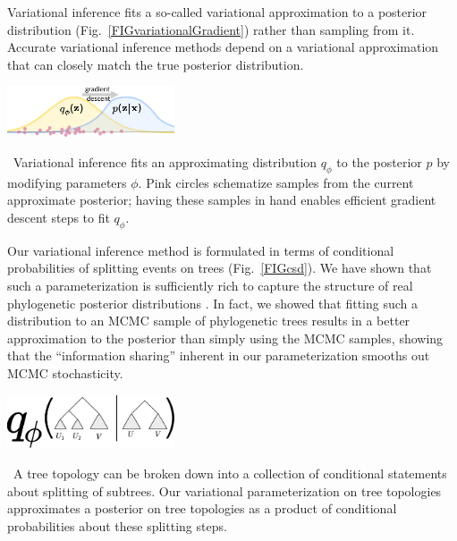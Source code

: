 \documentclass[nobib]{tufte-handout}
\begin{document}
Variational inference fits a so-called variational approximation to a posterior distribution (Fig.~\ref{FIGvariationalGradient}) rather than sampling from it.
Accurate variational inference methods depend on a variational approximation that can closely match the true posterior distribution.

\begin{marginfigure}[0.in]%
  \includegraphics[width=1.95in]{variational-gradient}
  \caption{\
    Variational inference fits an approximating distribution $q_\phi$ to the posterior $p$ by modifying parameters $\phi$.
    Pink circles schematize samples from the current approximate posterior; having these samples in hand enables efficient gradient descent steps to fit $q_\phi$.
    }
  \label{FIGvariationalGradient}
\end{marginfigure}%

Our variational inference method is formulated in terms of conditional probabilities of splitting events on trees (Fig.~\ref{FIGcsd}).
We have shown that such a parameterization is sufficiently rich to capture the structure of real phylogenetic posterior distributions \cite{Zhang2018-mm}.
In fact, we showed that fitting such a distribution to an MCMC sample of phylogenetic trees results in a better approximation to the posterior than simply using the MCMC samples, showing that the ``information sharing'' inherent in our parameterization smooths out MCMC stochasticity.

\begin{marginfigure}[0.7in]%
  \includegraphics[width=1.95in]{csd}
  \caption{\
    A tree topology can be broken down into a collection of conditional statements about splitting of subtrees.
    Our variational parameterization on tree topologies approximates a posterior on tree topologies as a product of conditional probabilities about these splitting steps.
    }
  \label{FIGcsd}
\end{marginfigure}%
\end{document}
